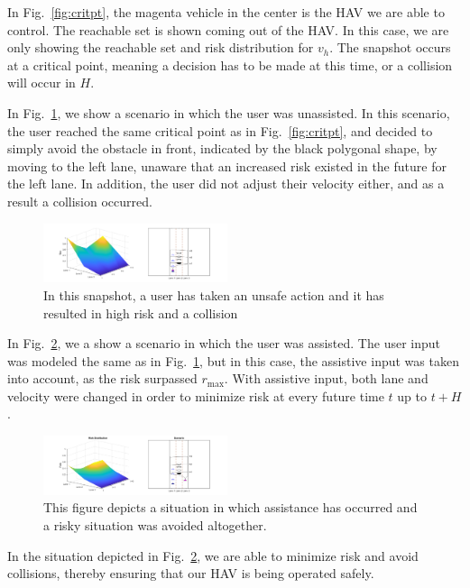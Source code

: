 \documentclass[letterpaper, 10 pt, conference]{ieeeconf}  %
\begin{document}
In Fig.~\ref{fig:critpt}, the magenta vehicle in the center is the HAV we are able to control. The reachable set is shown coming out of the HAV. In this case, we are only showing the reachable set and risk distribution for $v_h$. The snapshot occurs at a critical point, meaning a decision has to be made at this time, or a collision will occur in $H$. 


In Fig.~\ref{fig:noassist}, we show a scenario in which the user was unassisted. In this scenario, the user reached the same critical point as in Fig.~\ref{fig:critpt}, and decided to simply avoid the obstacle in front, indicated by the black polygonal shape, by moving to the left lane, unaware that an increased risk existed in the future for the left lane. In addition, the user did not adjust their velocity either, and as a result a collision occurred.

\begin{figure}[ht] 
    \includegraphics[width=0.48\textwidth]{fig/noassist.png} 
    \caption{In this snapshot, a user has taken an unsafe action and it has resulted in high risk and a collision} \label{fig:noassist} 
\end{figure}

In Fig.~\ref{fig:assist}, we a show a scenario in which the user was assisted. The user input was modeled the same as in Fig.~\ref{fig:noassist}, but in this case, the assistive input was taken into account, as the risk surpassed $r_{\max}$. With assistive input, both lane and velocity were changed in order to minimize risk at every future time $t$ up to $t+H$.

\begin{figure}[ht] 
    \includegraphics[width=0.48\textwidth]{fig/assist2.png} 
    \caption{This figure depicts a situation in which assistance has occurred and a risky situation was avoided altogether.} \label{fig:assist}
\end{figure}

 In the situation depicted in Fig.~\ref{fig:assist}, we are able to minimize risk and avoid collisions, thereby ensuring that our HAV is being operated safely.
\end{document}
